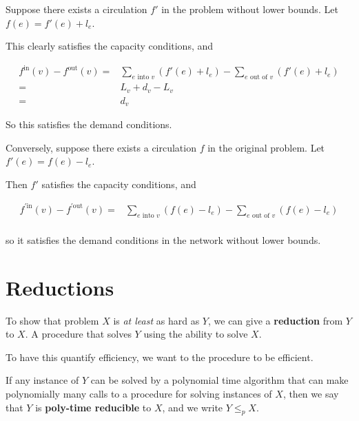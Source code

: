 \documentclass[12pt]{article}
\begin{document}
  {
    Suppose there exists a circulation $f'$ in the problem without lower bounds.
    Let $f(e) = f'(e) + l_e$.

    This clearly satisfies the capacity conditions, and

    \begin{align*}
      f^\text{in}(v) - f^\text{out}(v) =&\sum_{e \text{ into } v} (f'(e) + l_e)
      - \sum_{e \text{ out of } v} (f'(e) + l_e) \\
      =&L_v + d_v - L_v \\
      =&d_v
    \end{align*}

    So this satisfies the demand conditions.

    Conversely, suppose there exists a circulation $f$ in the original problem.
    Let $f'(e) = f(e) - l_e$.

    Then $f'$ satisfies the capacity conditions, and

    \begin{align*}
      f^{'\text{in}}(v) - f^{'\text{out}}(v) =&\sum_{e \text{ into } v} (f(e) - l_e) - \sum_{e \text{ out of } v} (f(e) - l_e) \\
    \end{align*}

    so it satisfies the demand conditions in the network without lower bounds.
  }

  \newpage
  \section{Reductions}

  To show that problem $X$ is {\it at least} as hard as $Y$, we can give a
  {\bf reduction} from $Y$ to $X$. A procedure that solves $Y$ using the ability
  to solve $X$.

  To have this quantify efficiency, we want to the procedure to be efficient.

  {
    If any instance of $Y$ can be solved by a polynomial time algorithm that can
    make polynomially many calls to a procedure for solving instances of $X$,
    then we say that $Y$ is {\bf poly-time reducible} to $X$, and we write $Y
    \le_{p} X$.
  }
\end{document}
